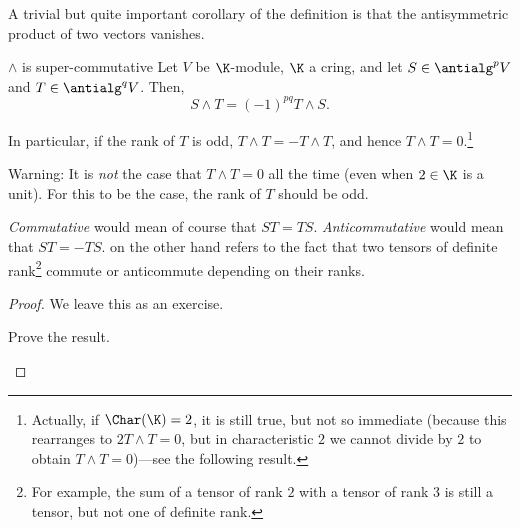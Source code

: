 A trivial but quite important corollary of the definition is that the antisymmetric product of two vectors vanishes.
\begin{prp}{$\wedge$ is super-commutative}{}
	Let $V$ be $\K$-module, $\K$ a cring, and let $S\in \antialg ^pV$ and $T\in \antialg ^qV$.  Then,
	\begin{equation}
		S\wedge T=(-1)^{pq}T\wedge S.
	\end{equation}
	\begin{rmk}
		In particular, if the rank of $T$ is odd, $T\wedge T=-T\wedge T$, and hence $T\wedge T=0$.\footnote{Actually, if $\Char (\K )=2$, it is still true, but not so immediate (because this rearranges to $2T\wedge T=0$, but in characteristic $2$ we cannot divide by $2$ to obtain $T\wedge T=0$)---see the following result.}
	\end{rmk}
	\begin{rmk}
		Warning:  It is \emph{not} the case that $T\wedge T=0$ all the time (even when $2\in \K$ is a unit).  For this to be the case, the rank of $T$ should be odd.
	\end{rmk}
	\begin{rmk}
		\emph{Commutative} would mean of course that $ST=TS$.  \emph{Anticommutative} would mean that $ST=-TS$.   on the other hand refers to the fact that two tensors of definite rank\footnote{For example, the sum of a tensor of rank $2$ with a tensor of rank $3$ is still a tensor, but not one of definite rank.} commute or anticommute depending on their ranks.
	\end{rmk}
	\begin{proof}
		We leave this as an exercise.
		\begin{exr}[breakable=false]{}{}
			Prove the result.
		\end{exr}
	\end{proof}
\end{prp}
